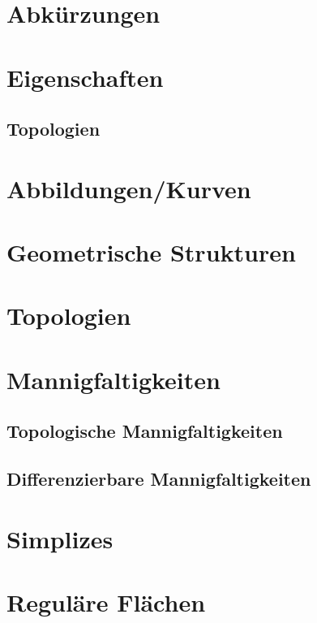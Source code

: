 \documentclass{article}
\theoremstyle{definition} %
\begin{document}
\section{Abkürzungen}



\clearpage
\section{Eigenschaften}
\subsection{Topologien}



\clearpage
\section{Abbildungen/Kurven}


\clearpage
\section{Geometrische Strukturen}



\clearpage
\section{Topologien}


\clearpage
\section{Mannigfaltigkeiten}

\subsection{Topologische Mannigfaltigkeiten}

\newpage
\subsection{Differenzierbare Mannigfaltigkeiten}


\clearpage
\section{Simplizes}


\clearpage
\section{Reguläre Flächen}

\newpage
\end{document}
